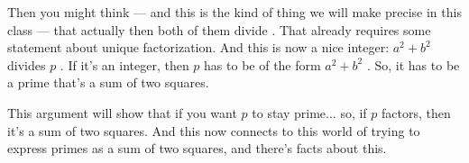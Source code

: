 \begin{speech}[00:05:18 - 00:06:08]
Then you might think --- and this is the kind of thing we will make precise in this class --- that actually then both of them divide . That already requires some statement about unique factorization. And this is now a nice integer: $a^2 + b^2$ divides $p$ . If it's an integer, then $p$ has to be of the form $a^2 + b^2$ . So, it has to be a prime that's a sum of two squares.

This argument will show that if you want $p$ to stay prime... so, if $p$ factors, then it's a sum of two squares. And this now connects to this world of trying to express primes as a sum of two squares, and there's facts about this.
\end{speech}

